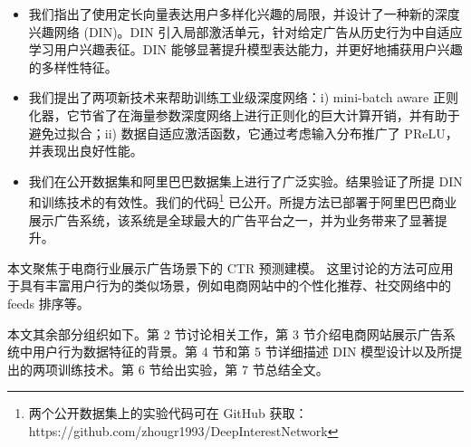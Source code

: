 \begin{itemize}
\item 我们指出了使用定长向量表达用户多样化兴趣的局限，并设计了一种新的深度兴趣网络 (DIN)。DIN 引入局部激活单元，针对给定广告从历史行为中自适应学习用户兴趣表征。DIN 能够显著提升模型表达能力，并更好地捕获用户兴趣的多样性特征。
\item 我们提出了两项新技术来帮助训练工业级深度网络：i) mini-batch aware 正则化器，它节省了在海量参数深度网络上进行正则化的巨大计算开销，并有助于避免过拟合；ii) 数据自适应激活函数，它通过考虑输入分布推广了 PReLU，并表现出良好性能。
\item 我们在公开数据集和阿里巴巴数据集上进行了广泛实验。结果验证了所提 DIN 和训练技术的有效性。我们的代码\footnote{两个公开数据集上的实验代码可在 GitHub 获取：https://github.com/zhougr1993/DeepInterestNetwork\label{code}} 已公开。所提方法已部署于阿里巴巴商业展示广告系统，该系统是全球最大的广告平台之一，并为业务带来了显著提升。
\end{itemize}





本文聚焦于电商行业展示广告场景下的 CTR 预测建模。
这里讨论的方法可应用于具有丰富用户行为的类似场景，例如电商网站中的个性化推荐、社交网络中的 feeds 排序等。

本文其余部分组织如下。第 2 节讨论相关工作，第 3 节介绍电商网站展示广告系统中用户行为数据特征的背景。第 4 节和第 5 节详细描述 DIN 模型设计以及所提出的两项训练技术。第 6 节给出实验，第 7 节总结全文。




